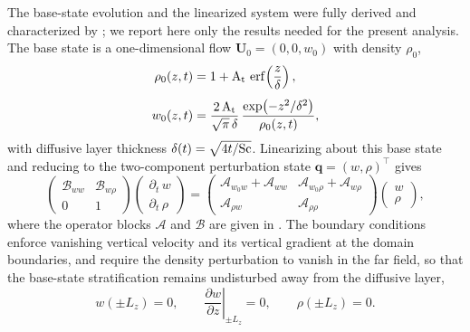 The base-state evolution and the linearized system were fully derived and characterized by \citet{kola-israel-towne-2026}; we report here only the results needed for the present analysis. The base state is a one-dimensional flow \(\boldsymbol{U}_0 = (0, 0, w_0)\) with density \(\rho_0\),
\begin{subequations}\label{eq:vd_base_state}
\begin{align}
    \rho_{0}(z,t) &= 1 + \mathrm{A_t}\,\operatorname{erf}\!\left(\frac{z}{\delta}\right), \label{eq:vd_base_state_rho0} \\[4pt]
    w_0(z,t) &= \frac{2\,\mathrm{A_t}}{\sqrt{\pi}\,\delta}\,
               \frac{\exp\!\left(-z^2/\delta^2\right)}{\rho_0(z,t)},
               \label{eq:vd_base_state_w0}
\end{align}
\end{subequations}
with diffusive layer thickness \(\delta(t)=\sqrt{4t/\mathrm{Sc}}\). Linearizing about this base state and reducing to the two-component perturbation state \(\boldsymbol{q} = (w, \rho)^\top\) gives
\begin{equation}
    \label{eq:vd_lin_continuous}
    \begin{pmatrix}
        \mathscr{B}_{ww} & \mathscr{B}_{w\rho} \\
        0 & 1
    \end{pmatrix}
    \begin{pmatrix}
        \partial_t\, w \\[4pt]
        \partial_t\,\rho
    \end{pmatrix}
    =
    \begin{pmatrix}
        \mathscr{A}_{w_0w}+\mathscr{A}_{ww} & \mathscr{A}_{w_0\rho}+\mathscr{A}_{w\rho} \\[4pt]
        \mathscr{A}_{\rho w} & \mathscr{A}_{\rho\rho}
    \end{pmatrix}
    \begin{pmatrix}
        w \\[4pt]
        \rho
    \end{pmatrix},
\end{equation}
where the operator blocks \(\mathscr{A}\) and \(\mathscr{B}\) are given in . The boundary conditions enforce vanishing vertical velocity and its vertical gradient at the domain boundaries, and require the density perturbation to vanish in the far field, so that the base-state stratification remains undisturbed away from the diffusive layer,
\begin{equation}
    \label{eq:vd_boundary_conditions}
    w(\pm L_z) = 0, \qquad \left.\frac{\partial w}{\partial z}\right|_{\pm L_z} = 0, \qquad
    \rho(\pm L_z) = 0.
\end{equation}
